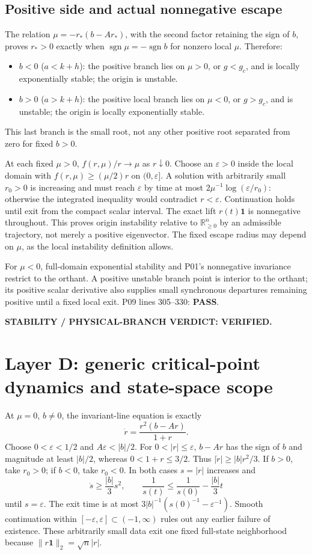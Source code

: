 \documentclass[11pt]{article}
\newcommand{\one}{\mathbf{1}}
\newcommand{\R}{\mathbb R}
\newcommand{\Orth}{\R_{\geq0}^n}
\newcommand{\norm}[1]{\lVert#1\rVert}
\newcommand{\lin}[1]{P09 lines #1}
\newcommand{\pass}{\textbf{PASS}}
\begin{document}
\subsection{Positive side and actual nonnegative escape}
The relation $\mu=-r_*(b-Ar_*)$, with the second factor retaining the sign
of $b$, proves $r_*>0$ exactly when
$\operatorname{sgn}\mu=-\operatorname{sgn}b$ for nonzero local $\mu$.
Therefore:
\begin{itemize}[leftmargin=*]
\item $b<0$ ($a<k+h$): the positive branch lies on $\mu>0$, or $g<g_c$,
and is locally exponentially stable; the origin is unstable.
\item $b>0$ ($a>k+h$): the positive local branch lies on $\mu<0$, or
$g>g_c$, and is unstable; the origin is locally exponentially stable.
\end{itemize}
This last branch is the small root, not any other positive root separated
from zero for fixed $b>0$.

At each fixed $\mu>0$, $f(r,\mu)/r\to\mu$ as $r\downarrow0$.
Choose an $\varepsilon>0$ inside the local domain with
$f(r,\mu)\ge(\mu/2)r$ on $(0,\varepsilon]$. A solution with arbitrarily
small $r_0>0$ is increasing and must reach $\varepsilon$ by time at most
$2\mu^{-1}\log(\varepsilon/r_0)$: otherwise the integrated inequality
would contradict $r<\varepsilon$. Continuation holds until exit from
the compact scalar interval. The exact lift $r(t)\one$ is nonnegative
throughout. This proves origin instability relative to $\Orth$ by an
admissible trajectory, not merely a positive eigenvector. The fixed escape
radius may depend on $\mu$, as the local instability definition allows.

For $\mu<0$, full-domain exponential stability and P01's nonnegative
invariance restrict to the orthant. A positive unstable branch point is
interior to the orthant; its positive scalar derivative also supplies
small synchronous departures remaining positive until a fixed local exit.
\lin{305--330}: \pass.

\textbf{STABILITY / PHYSICAL-BRANCH VERDICT: VERIFIED.}

\section{Layer D: generic critical-point dynamics and state-space scope}
\label{sec:critical}
At $\mu=0$, $b\ne0$, the invariant-line equation is exactly
\[
 \dot r=\frac{r^2(b-Ar)}{1+r}.
\]
Choose $0<\varepsilon<1/2$ and $A\varepsilon<|b|/2$. For
$0<|r|\le\varepsilon$, $b-Ar$ has the sign of $b$ and magnitude
at least $|b|/2$, whereas $0<1+r\le3/2$. Thus
$|\dot r|\ge |b|r^2/3$. If $b>0$, take $r_0>0$; if $b<0$, take
$r_0<0$. In both cases $s=|r|$ increases and
\[
 \dot s\ge\frac{|b|}{3}s^2,\qquad
 \frac1{s(t)}\le\frac1{s(0)}-\frac{|b|}{3}t
\]
until $s=\varepsilon$. The exit time is at most
$3|b|^{-1}(s(0)^{-1}-\varepsilon^{-1})$. Smooth continuation within
$[-\varepsilon,\varepsilon]\subset(-1,\infty)$ rules out any earlier
failure of existence. These arbitrarily small data exit one fixed
full-state neighborhood because $\norm{r\one}_2=\sqrt n|r|$.
\end{document}
